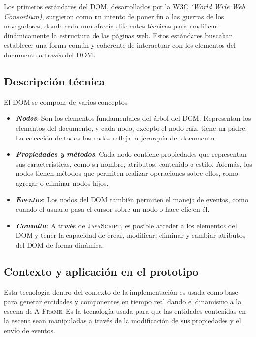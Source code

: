 \documentclass[a4paper, 11pt]{book}
\begin{document}
Los primeros estándares del \textsc{DOM}, desarrollados por la \textsc{W3C} \emph{(World Wide Web Consortium)}, surgieron como un intento de poner fin a las guerras de los navegadores, donde cada uno ofrecía diferentes técnicas para modificar dinámicamente la estructura de las páginas web. Estos estándares buscaban establecer una forma común y coherente de interactuar con los elementos del documento a través del \textsc{DOM}.
\subsection{Descripción técnica}
El \textsc{DOM} se compone de varios conceptos:
\begin{itemize}
    \item \textbf{\emph{Nodos}}: Son los elementos fundamentales del árbol del \textsc{DOM}. Representan los elementos del documento, y cada nodo, excepto el nodo raíz, tiene un padre. La colección de todos los nodos refleja la jerarquía del documento.
    \item \textbf{\emph{Propiedades y métodos}}: Cada nodo contiene propiedades que representan sus características, como su nombre, atributos, contenido o estilo. Además, los nodos tienen métodos que permiten realizar operaciones sobre ellos, como agregar o eliminar nodos hijos.
    \item \textbf{\emph{Eventos}}: Los nodos del \textsc{DOM} también permiten el manejo de eventos, como cuando el usuario pasa el cursor sobre un nodo o hace clic en él.
    \item \textbf{\emph{Consulta}}: A través de \textsc{JavaScript}, es posible acceder a los elementos del \textsc{DOM} y tener la capacidad de crear, modificar, eliminar y cambiar atributos del \textsc{DOM} de forma dinámica.
\end{itemize}
\subsection{Contexto y aplicación en el prototipo}
Esta tecnología dentro del contexto de la implementación es usada como base para generar entidades y componentes en tiempo real dando el dinamismo a la escena de \textsc{A-Frame}. Es la tecnología usada para que las entidades contenidas en la escena sean manipuladas a través de la modificación de sus propiedades y el envío de eventos.
\end{document}
